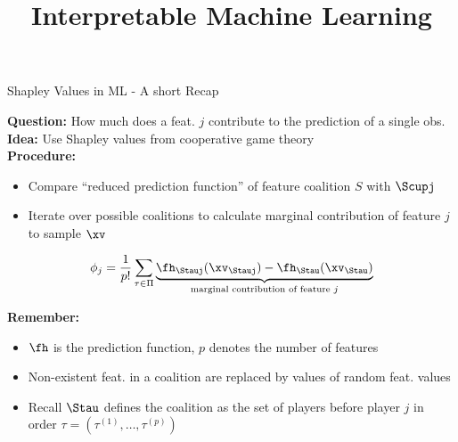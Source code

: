 \documentclass[11pt,compress,t,notes=noshow, aspectratio=169, xcolor=table]{beamer}
\title{Interpretable Machine Learning}
\date{}
\begin{document}
\newcommand{\titlefigure}{figure_man/exSHAP.png}
\newcommand{\learninggoals}{
\item Get an intuition of additive feature attributions
\item Understand the concept of Kernel SHAP
\item Ability to interpret SHAP plots
\item Global SHAP methods
}


\begin{frame}{Shapley Values in ML - A short Recap}
  
  \textbf{Question:} How much does a feat. $j$ contribute to the prediction of a single obs. \\
  \textbf{Idea:} Use Shapley values from cooperative game theory \\
  \pause
  \textbf{Procedure:} 
  \begin{itemize}
    \item Compare ``reduced prediction function'' of feature coalition $S$ with $\Scupj$ 
    \item Iterate over possible coalitions to calculate marginal contribution of feature $j$ to sample $\xv$
\end{itemize}

$$\phi_j 
= \frac{1}{p!} \sum_{\tau \in \Pi}  \underbrace{\fh_{\Stauj}(\xv_{\Stauj}) - \fh_{\Stau}(\xv_{\Stau})}_{\text{marginal contribution of feature $j$}} $$

\pause
\textbf{Remember:}

\begin{itemize}
    \item $\fh$ is the prediction function, $p$ denotes the number of features
    \item Non-existent feat. in a coalition are replaced by values of random feat. values 
    \item Recall $\Stau$ defines the coalition as the set of players before player $j$ in order $\tau = (\tau^{(1)}, \dots, \tau^{(p)})$%
    

\end{itemize}
\end{frame}
\end{document}
